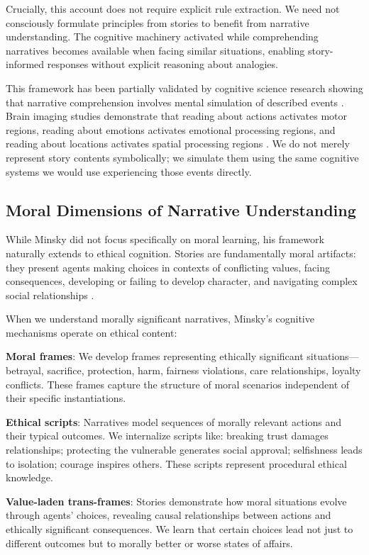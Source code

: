 \documentclass[12pt]{article}
\begin{document}
Crucially, this account does not require explicit rule extraction. We need not consciously formulate principles from stories to benefit from narrative understanding. The cognitive machinery activated while comprehending narratives becomes available when facing similar situations, enabling story-informed responses without explicit reasoning about analogies.

This framework has been partially validated by cognitive science research showing that narrative comprehension involves mental simulation of described events \citep{zwaan2004constructionist, speer2009reading}. Brain imaging studies demonstrate that reading about actions activates motor regions, reading about emotions activates emotional processing regions, and reading about locations activates spatial processing regions \citep{hasson2004intersubject}. We do not merely represent story contents symbolically; we simulate them using the same cognitive systems we would use experiencing those events directly.

\subsection{Moral Dimensions of Narrative Understanding}

While Minsky did not focus specifically on moral learning, his framework naturally extends to ethical cognition. Stories are fundamentally moral artifacts: they present agents making choices in contexts of conflicting values, facing consequences, developing or failing to develop character, and navigating complex social relationships \citep{nussbaum1990love, bruner1991narrative}.

When we understand morally significant narratives, Minsky's cognitive mechanisms operate on ethical content:

\textbf{Moral frames}: We develop frames representing ethically significant situations---betrayal, sacrifice, protection, harm, fairness violations, care relationships, loyalty conflicts. These frames capture the structure of moral scenarios independent of their specific instantiations.

\textbf{Ethical scripts}: Narratives model sequences of morally relevant actions and their typical outcomes. We internalize scripts like: breaking trust damages relationships; protecting the vulnerable generates social approval; selfishness leads to isolation; courage inspires others. These scripts represent procedural ethical knowledge.

\textbf{Value-laden trans-frames}: Stories demonstrate how moral situations evolve through agents' choices, revealing causal relationships between actions and ethically significant consequences. We learn that certain choices lead not just to different outcomes but to morally better or worse states of affairs.
\end{document}
